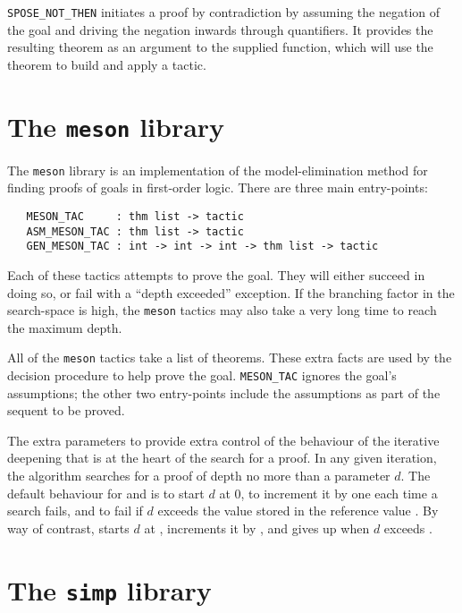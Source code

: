 \texttt{SPOSE\_NOT\_THEN} initiates a proof by
contradiction by assuming the negation of the goal and driving the
negation inwards through quantifiers. It provides the resulting theorem
as an argument to the supplied function, which will use the theorem to
build and apply a tactic.

\section{The \texttt{meson} library}
\label{sec:mesonLib}

The \texttt{meson} library is an implementation of the
model-elimination method for finding proofs of goals in first-order
logic.  There are three main entry-points:

\begin{verbatim}
   MESON_TAC     : thm list -> tactic
   ASM_MESON_TAC : thm list -> tactic
   GEN_MESON_TAC : int -> int -> int -> thm list -> tactic
\end{verbatim}

Each of these tactics attempts to prove the goal.  They will either
succeed in doing so, or fail with a ``depth exceeded'' exception.  If
the branching factor in the search-space is high, the \texttt{meson}
tactics may also take a very long time to reach the maximum depth.

All of the \texttt{meson} tactics take a list of theorems.  These
extra facts are used by the decision procedure to help prove the goal.
\texttt{MESON\_TAC} ignores the goal's assumptions; the other two
entry-points include the assumptions as part of the sequent to be
proved.

The extra parameters to  provide extra control of
the behaviour of the iterative deepening that is at the heart of the
search for a proof.  In any given iteration, the algorithm searches
for a proof of depth no more than a parameter $d$.  The default
behaviour for  and  is to start $d$
at 0, to increment it by one each time a search fails, and to fail if
$d$ exceeds the value stored in the reference value
.  By way of contrast,
 starts $d$ at , increments
it by , and gives up when $d$ exceeds .



\section{The \texttt{simp} library}
\label{sec:simpLib}

